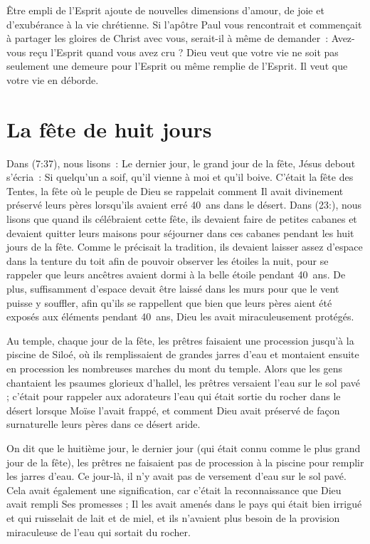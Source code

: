 Être empli de l'Esprit ajoute de nouvelles dimensions d'amour,
 de joie et d'exubérance à la vie chrétienne.
 Si l'apôtre Paul vous rencontrait et commençait à partager les gloires
 de Christ avec vous, serait-il à même de demander~:
 \og Avez-vous reçu l'Esprit quand vous avez cru ? \fg{}
 Dieu veut que votre vie ne soit pas seulement une demeure
 pour l'Esprit ou même remplie de l'Esprit.
 Il veut que votre vie en déborde.


\section*{La fête de huit jours}

Dans (7:37), nous lisons~:
 \og Le dernier jour, le grand jour de la fête, Jésus debout s'écria~:
 Si quelqu'un a soif, qu'il vienne à moi et qu'il boive. \fg{}
 C'était la fête des Tentes, la fête où le peuple de Dieu se rappelait
 comment Il avait divinement préservé leurs pères lorsqu'ils avaient erré
 40~ans dans le désert.
 Dans (23:), nous lisons que quand ils célébraient cette fête,
 ils devaient faire de petites cabanes et devaient quitter leurs maisons
 pour séjourner dans ces cabanes pendant les huit jours de la fête.
 Comme le précisait la tradition, ils devaient laisser assez d'espace
 dans la tenture du toit afin de pouvoir observer les étoiles la nuit,
 pour se rappeler que leurs ancêtres avaient dormi à la belle étoile
 pendant 40~ans. De plus, suffisamment d'espace devait être laissé
 dans les murs pour que le vent puisse y souffler, afin qu'ils se rappellent
 que bien que leurs pères aient été exposés aux éléments pendant 40~ans,
 Dieu les avait miraculeusement protégés.

Au temple, chaque jour de la fête, les prêtres faisaient une procession
 jusqu'à la piscine de Siloé, où ils remplissaient de grandes jarres d'eau
 et montaient ensuite en procession les nombreuses marches du mont du temple.
 Alors que les gens chantaient les psaumes glorieux d'hallel,
 les prêtres versaient l'eau sur le sol pavé ; c'était pour rappeler
 aux adorateurs l'eau qui était sortie du rocher dans le désert lorsque Moïse
 l'avait frappé, et comment Dieu avait préservé de façon surnaturelle
 leurs pères dans ce désert aride. 

On dit que le huitième jour, le dernier jour (qui était connu comme
 le plus grand jour de la fête), les prêtres ne faisaient pas de procession
 à la piscine pour remplir les jarres d'eau.
 Ce jour-là, il n'y avait pas de versement d'eau sur le sol pavé.
 Cela avait également une signification, car c'était la reconnaissance
 que Dieu avait rempli Ses promesses ; Il les avait amenés dans le pays
 qui était bien irrigué et qui ruisselait de lait et de miel,
 et ils n'avaient plus besoin de la provision miraculeuse de l'eau
 qui sortait du rocher.

